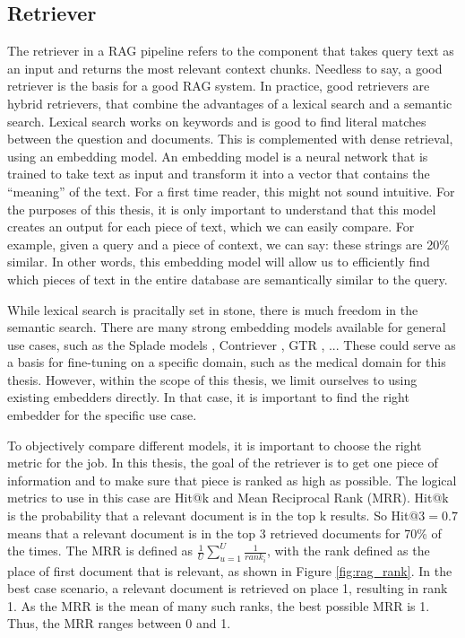 \subsection{Retriever}
The retriever in a RAG pipeline refers to the component that takes query text as an input and returns the most relevant context chunks. Needless to say, a good retriever is the basis for a good RAG system. In practice, good retrievers are hybrid retrievers, that combine the advantages of a lexical search and a semantic search. Lexical search works on keywords and is good to find literal matches between the question and documents. This is complemented with dense retrieval, using an embedding model. An embedding model is a neural network that is trained to take text as input and transform it into a vector that contains the ``meaning'' of the text. For a first time reader, this might not sound intuitive. For the purposes of this thesis, it is only important to understand that this model creates an output for each piece of text, which we can easily compare. For example, given a query and a piece of context, we can say: these strings are 20\% similar. In other words, this embedding model will allow us to efficiently find which pieces of text in the entire database are semantically similar to the query. 

While lexical search is pracitally set in stone, there is much freedom in the semantic search. There are many strong embedding models available for general use cases, such as the Splade models \cite{formal2021splade, formal2021spladev2, lassance2024spladev3}, Contriever \cite{izacard2021unsupervisedcontriever}, GTR \cite{ni2021largegtr}, ... These could serve as a basis for fine-tuning on a specific domain, such as the medical domain for this thesis. However, within the scope of this thesis, we limit ourselves to using existing embedders directly. In that case, it is important to find the right embedder for the specific use case.

To objectively compare different models, it is important to choose the right metric for the job. In this thesis, the goal of the retriever is to get one piece of information and to make sure that piece is ranked as high as possible. The logical metrics to use in this case are Hit@k and Mean Reciprocal Rank (MRR). Hit@k is the probability that a relevant document is in the top k results. So Hit@3$=0.7$ means that a relevant document is in the top 3 retrieved documents for 70\% of the times. The MRR is defined as $\frac{1}{U} \sum_{u=1}^U \frac{1}{rank_i}$, with the rank defined as the place of first document that is relevant, as shown in Figure \ref{fig:rag_rank}. In the best case scenario, a relevant document is retrieved on place 1, resulting in rank 1. As the MRR is the mean of many such ranks, the best possible MRR is 1. Thus, the MRR ranges between 0 and 1.

